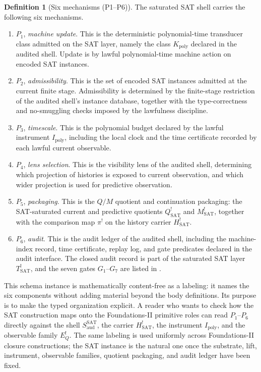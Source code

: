 \documentclass[11pt]{article}
\newcommand{\Tsat}{T^{!}_{\mathrm{SAT}}}
\newcommand{\Saud}{S_{\mathrm{aud}}^{\mathrm{SAT}}}
\newcommand{\Hsat}{H^{!}_{\mathrm{SAT}}}
\newcommand{\Ipoly}{I_{\mathrm{poly}}}
\newcommand{\EQbang}{E^{!}_{Q}}
\newcommand{\Qsat}{Q^{!}_{\mathrm{SAT}}}
\newcommand{\Msat}{M^{!}_{\mathrm{SAT}}}
\newcommand{\ComparisonMap}{\pi^{!}}
\theoremstyle{definition}
\newtheorem{definition}[theorem]{Definition}
\begin{document}
\begin{definition}[Six mechanisms (P1--P6)]
\label{def:pvnp:six-mechanisms}
The saturated SAT shell carries the following six mechanisms.
\begin{enumerate}
  \item \(P_{1}\), \emph{machine update}.  This is the deterministic
  polynomial-time transducer class admitted on the SAT layer, namely
  the class \(K_{\mathrm{poly}}\) declared in the audited shell.
  Update is by lawful polynomial-time machine action on encoded SAT
  instances.

  \item \(P_{2}\), \emph{admissibility}.  This is the set of encoded
  SAT instances admitted at the current finite stage.  Admissibility is
  determined by the finite-stage restriction of the audited shell's
  instance database, together with the type-correctness and
  no-smuggling checks imposed by the lawfulness discipline.

  \item \(P_{3}\), \emph{timescale}.  This is the polynomial budget
  declared by the lawful instrument \(\Ipoly\), including the local
  clock and the time certificate recorded by each lawful current
  observable.

  \item \(P_{4}\), \emph{lens selection}.  This is the visibility lens
  of the audited shell, determining which projection of histories is
  exposed to current observation, and which wider projection is used
  for predictive observation.

  \item \(P_{5}\), \emph{packaging}.  This is the \(Q/M\) quotient and
  continuation packaging: the SAT-saturated current and predictive
  quotients \(\Qsat\) and \(\Msat\), together with the comparison map
  \(\ComparisonMap\) on the history carrier \(\Hsat\).

  \item \(P_{6}\), \emph{audit}.  This is the audit ledger of the
  audited shell, including the machine-index record, time certificate,
  replay log, and gate predicates declared in the audit interface.  The
  closed audit record is part of the saturated SAT layer \(\Tsat\), and
  the seven gates \(G_{1}\)--\(G_{7}\) are listed in
  .
\end{enumerate}
\end{definition}

This schema instance is mathematically content-free as a labeling: it
names the six components without adding material beyond the body
definitions.  Its purpose is to make the typed organization explicit.
A reader who wants to check how the SAT construction maps onto the
Foundations-II primitive roles can read \(P_{1}\)--\(P_{6}\) directly
against the shell \(\Saud\), the carrier \(\Hsat\), the instrument
\(\Ipoly\), and the observable family \(\EQbang\).  The same labeling
is used uniformly across Foundations-II closure constructions; the SAT
instance is the natural one once the substrate, lift, instrument,
observable families, quotient packaging, and audit ledger have been
fixed.
\end{document}
